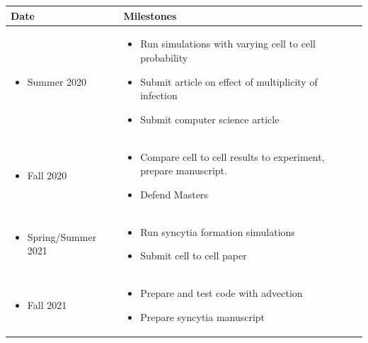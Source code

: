 \documentclass[a4paper]{article}
\begin{document}
\begin{centering}
{\makegapedcells
\begin{longtable}{|p{}|p{}|}
    \hline
    \raggedleft \Large \textbf{Date} & \Large \textbf{Milestones}\\
    \hline
    \begin{itemize} 
    \raggedleft 
        \item[] Summer 2020
    \end{itemize} 
    &
    \begin{itemize} 
        \item Run simulations with varying cell to cell probability
        \item Submit article on effect of multiplicity of infection
        \item Submit computer science article 
    \end{itemize}\\
    \hline
    \begin{itemize} 
    \raggedleft 
        \item[] Fall 2020 
    \end{itemize}
    & 
    \begin{itemize} 
        \item Compare cell to cell results to experiment, prepare manuscript.
        \item Defend Masters
    \end{itemize}\\
    \hline
    \begin{itemize}
    \raggedleft 
        \item[] Spring/Summer 2021 
    \end{itemize}
    & 
    \begin{itemize} 
        \item Run syncytia formation simulations
        \item Submit cell to cell paper
    \end{itemize}\\
    \hline
    \begin{itemize}
    \raggedleft 
        \item[] Fall 2021 
    \end{itemize}
    & 
    \begin{itemize} 
        \item Prepare and test code with advection
        \item Prepare syncytia manuscript
    \end{itemize}\\

\end{longtable}}
\end{centering}
\end{document}
